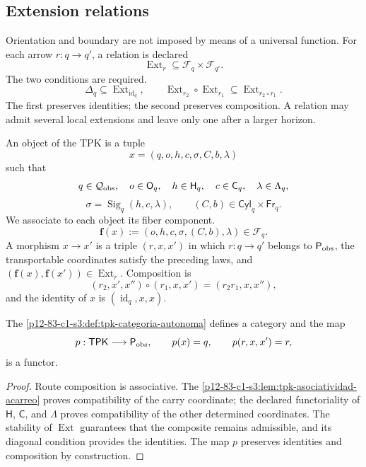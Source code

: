 {\subsection{Extension relations}

Orientation and boundary are not imposed by means of a universal function.
For each arrow \(r:q\to q'\), a relation is declared
\[
 \operatorname{Ext}_r\subseteq\mathcal F_q\times\mathcal F_{q'}.
\]
The two conditions are required.
\[
 \Delta_q\subseteq\operatorname{Ext}_{\operatorname{id}_q},
 \qquad
 \operatorname{Ext}_{r_2}\circ\operatorname{Ext}_{r_1}
 \subseteq\operatorname{Ext}_{r_2\circ r_1}.
\]
The first preserves identities; the second preserves composition. A
relation may admit several local extensions and leave only one after a
larger horizon.

\begin{definition}
\label{p12-83-c1-s3:def:tpk-categoria-autonoma}
An object of the TPK is a tuple
\[
 x=(q,o,h,c,\sigma,C,b,\lambda)
\]
such that
\[
 q\in\mathcal Q_{\rm obs},\quad
 o\in\mathsf O_q,\quad
 h\in\mathsf H_q,\quad
 c\in\mathsf C_q,\quad
 \lambda\in\Lambda_q,
\]
\[
 \sigma=\operatorname{Sig}_q(h,c,\lambda),
 \qquad
 (C,b)\in\mathsf{Cyl}_q\times\mathsf{Fr}_q.
\]
We associate to each object its fiber component.
\[
 \mathbf f(x):=(o,h,c,\sigma,(C,b),\lambda)\in\mathcal F_q.
\]
A morphism \(x\to x'\) is a triple \((r,x,x')\) in which
\(r:q\to q'\) belongs to \(\mathsf P_{\rm obs}\), the transportable
coordinates satisfy the preceding laws, and
\((\mathbf f(x),\mathbf f(x'))\in
\operatorname{Ext}_r\). Composition is
\[
 (r_2,x',x'')\circ(r_1,x,x')=(r_2r_1,x,x''),
\]
and the identity of \(x\) is \((\operatorname{id}_q,x,x)\).
\end{definition}

\begin{theorem}
\label{p12-83-c1-s3:thm:tpk-es-categoria}
The \cref{p12-83-c1-s3:def:tpk-categoria-autonoma} defines a category and the map
\[
 p:\mathsf{TPK}\longrightarrow\mathsf P_{\rm obs},
 \qquad p(x)=q,\qquad p(r,x,x')=r,
\]
is a functor.
\end{theorem}

\begin{proof}
Route composition is associative. The
\cref{p12-83-c1-s3:lem:tpk-asociatividad-acarreo} proves compatibility of the
carry coordinate; the declared functoriality of \(\mathsf H\),
\(\mathsf C\), and \(\Lambda\) proves compatibility of the other determined
coordinates. The stability of \(\operatorname{Ext}\) guarantees that the
composite remains admissible, and its diagonal condition provides the
identities. The map \(p\) preserves identities and composition by
construction.
\end{proof}

}
